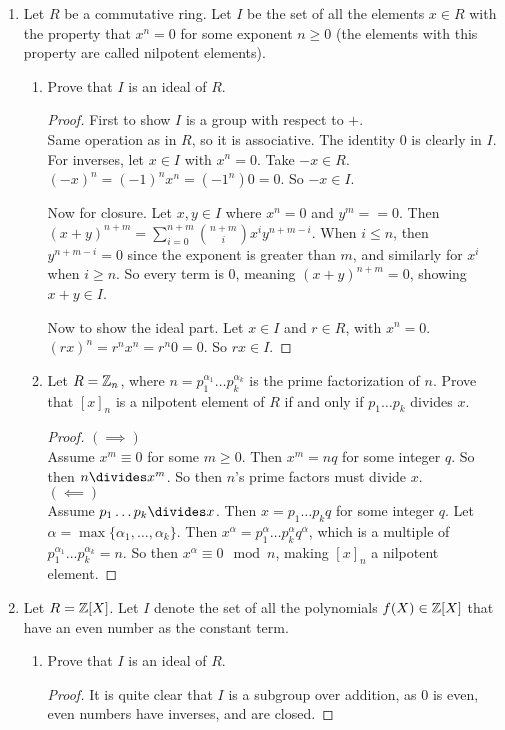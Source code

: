 \documentclass[12pt]{article}
\begin{document}
\begin{enumerate}
		
		\item Let $R$ be a commutative ring. Let $I$ be the set of all the elements $x \in R$ with the property that $x^n = 0$ for some exponent $n\geq0$ (the elements with this property are called nilpotent elements).
		\begin{enumerate}
			\item Prove that $I$ is an ideal of $R$.
			\begin{proof}
				First to show $I$ is a group with respect to $+$.\\
				Same operation as in $R$, so it is associative. The identity 0 is clearly in $I$. For inverses, let $x \in I$ with $x^n=0$. Take $-x \in R$. $(-x)^n = (-1)^nx^n = (-1^n)0 = 0$. So $-x \in I$.
				
				Now for closure. Let $x,y \in I$ where $x^n = 0$ and $y^m = =0$. Then $(x+y)^{n+m} = \sum_{i=0}^{n+m}\binom{n+m}{i} x^i y^{n+m-i}$. When $i \leq n$, then $y^{n+m-i} = 0$ since the exponent is greater than $m$, and similarly for $x^i$ when $i \geq n$. So every term is 0, meaning $(x+y)^{n+m} = 0$, showing $x+y \in I$.
				
				Now to show the ideal part. Let $x \in I$ and $r \in R$, with $x^n = 0$. $(rx)^n = r^nx^n = r^n0 = 0$. So $rx \in I$.
			\end{proof}
			
			\item Let $R = \mathbb{Z}_n$, where $n = p_1^{\alpha_1} \ldots p_k^{\alpha_k}$ is the prime factorization of $n$. Prove that $[x]_n$ is a nilpotent element of $R$ if and only if $p_1 \ldots p_k$ divides $x$.
			\begin{proof}
				$(\implies)$\\
				Assume $x^m \equiv 0$ for some $m\geq0$. Then $x^m = nq$ for some integer $q$. So then $n \divides x^m$. So then $n$'s prime factors must divide $x$.\\
				$(\impliedby)$\\
				Assume $p_1 \ldots p_k \divides x$. Then $x = p_1 \ldots p_k q$ for some integer $q$. Let $\alpha = \max\{\alpha_1,\ldots,\alpha_k\}$. Then $x^\alpha = p_1^\alpha \ldots p_k^\alpha q^\alpha$, which is a multiple of $p_1^{\alpha_1} \ldots p_k^{\alpha_k} = n$. So then $x^\alpha \equiv 0 \mod n$, making $[x]_n$ a nilpotent element. 
			\end{proof}
		\end{enumerate}
		
		
		\item Let $R = \mathbb{Z}[X]$. Let $I$ denote the set of all the polynomials $f(X) \in \mathbb{Z}[X]$ that have an even number as the constant term.
		\begin{enumerate}
			\item Prove that $I$ is an ideal of $R$.
			\begin{proof}
				It is quite clear that $I$ is a subgroup over addition, as 0 is even, even numbers have inverses, and are closed.
				

\end{proof}
\end{enumerate}
\end{enumerate}
\end{document}
